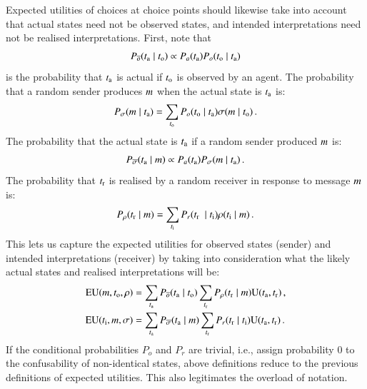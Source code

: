 \documentclass[11pt,english]{article}
\numberwithin{equation}{section}
\begin{document}
\begin{appendices}
Expected utilities of choices at choice points should likewise take into account that actual states
need not be observed states, and intended interpretations need not be realised
interpretations. First, note that
\begin{align*}
  P_{\overline{o}}(t_{\mathrm{a}} \mid t_{\mathrm{o}}) \propto P_a(t_{\mathrm{a}}) P_o(t_{\mathrm{o}}
    \mid t_{\mathrm{a}})
\end{align*}
is the probability that $t_{\mathrm{a}}$ is actual if $t_{\mathrm{o}}$ is observed by an agent. The
probability that a random sender produces $m$ when the actual state is $t_{\mathrm{a}}$ is:
\begin{align*}
  P_{\sigma}(m \mid t_{\mathrm{a}}) = \sum_{t_{\mathrm{o}}} P_o(t_{\mathrm{o}} \mid
  t_{\mathrm{a}}) \sigma(m \mid t_{\mathrm{o}})\,. 
\end{align*}
The probability that the actual state is $t_{\mathrm{a}}$ if a random sender produced $m$ is:
\begin{align*}
  P_{\overline{\sigma}}(t_{\mathrm{a}} \mid m) \propto P_a(t_{\mathrm{a}})
  P_{\sigma}(m \mid t_{\mathrm{a}})\,. 
\end{align*}
The probability that $t_{\mathrm{r}}$ is realised by a random receiver in response to
message $m$ is:
\begin{align*}
  P_{\rho}(t_{\mathrm{r}} \mid m) = \sum_{t_{\mathrm{i}}} P_r(t_{\mathrm{r}} \ \mid
  t_{\mathrm{i}}) \rho(t_{\mathrm{i}} \mid m)\,.
\end{align*}
This lets us capture the expected utilities for observed states (sender) and intended
interpretations (receiver) by taking into consideration what the likely actual states and
realised interpretations will be:
\begin{align*}
  \mathrm{EU}(m , t_{\mathrm{o}}, \rho) & = \sum_{t_{\mathrm{a}}} P_{\overline{o}}(t_{\mathrm{a}}
  \mid t_{\mathrm{o}}) \sum_{t_{\mathrm{r}}} P_{\rho}(t_{\mathrm{r}} \mid
  m) \mathrm{U}(t_{\mathrm{a}}, t_{\mathrm{r}})\,, \\
  \mathrm{EU}(t_{\mathrm{i}}, m, \sigma) & = \sum_{t_{\mathrm{a}}} P_{\overline{\sigma}}(t_{\mathrm{a}}
  \mid m) \sum_{t_{\mathrm{r}}} P_{r}(t_{\mathrm{r}} \mid t_{\mathrm{i}})
  \mathrm{U}(t_{\mathrm{a}}, t_{\mathrm{r}})\,.
\end{align*}
If the conditional probabilities $P_o$ and $P_r$ are trivial, i.e., assign probability 0 to the
confusability of non-identical states, above definitions reduce to the
previous definitions of expected utilities. This also legitimates the overload of notation.



\end{appendices}
\end{document}
